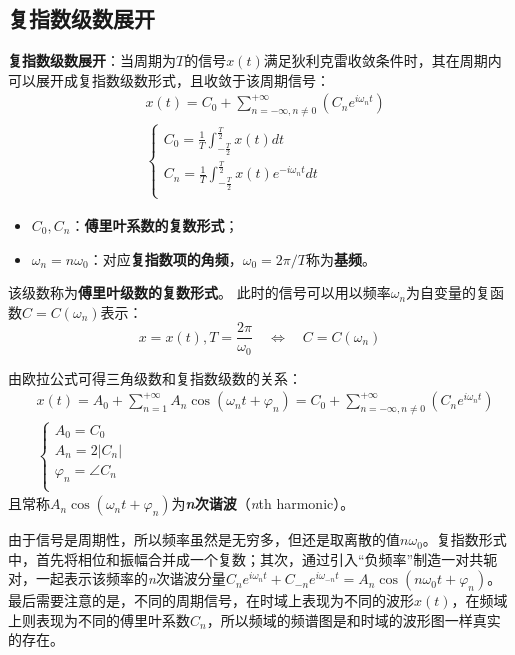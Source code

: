 \subsection{复指数级数展开}

{\bf 复指数级数展开}：当周期为$T$的信号$x\left( t \right) $满足狄利克雷收敛条件时，其在周期内可以展开成复指数级数形式，且收敛于该周期信号：
\begin{align*}
&x\left( t \right) =C_0+\sum_{n=-\infty ,n\ne 0}^{+\infty}{\left( C_ne^{i\omega _nt} \right)} \\
&\begin{cases}
	C_0=\frac{1}{T}\int_{-\frac{T}{2}}^{\frac{T}{2}}{x\left( t \right) dt}\\
	C_n=\frac{1}{T}\int_{-\frac{T}{2}}^{\frac{T}{2}}{x\left( t \right) e^{-i\omega _nt}dt}\\
\end{cases}
\end{align*}
\begin{itemize}
    \item $C_0,C_n$：{\bf 傅里叶系数的复数形式}；
    \item $\omega _n=n\omega _0$：对应{\bf 复指数项的角频}，$\omega _0=2\pi /T$称为{\bf 基频}。
\end{itemize}
该级数称为{\bf 傅里叶级数的复数形式}。
此时的信号可以用以频率$\omega _n$为自变量的复函数$C=C\left( \omega _n \right) $表示：
\[
x=x\left( t \right) ,T=\frac{2\pi}{\omega _0} \quad \Leftrightarrow \quad C=C\left( \omega _n \right)
\]

由欧拉公式可得三角级数和复指数级数的关系：
\begin{align*}
&x\left( t \right) =A_0+\sum_{n=1}^{+\infty}{A_n\cos \left( \omega _nt+\varphi _n \right)}=C_0+\sum_{n=-\infty ,n\ne 0}^{+\infty}{\left( C_ne^{i\omega _nt} \right)} \\
&\begin{cases}
	A_0=C_0\\
	A_n=2\left| C_n \right|\\
	\varphi _n=\angle C_n\\
\end{cases}
\end{align*}
且常称$A_n\cos \left( \omega _nt+\varphi _n \right) $为{\bf {\it n}次谐波}（{\it n}th harmonic）。

由于信号是周期性，所以频率虽然是无穷多，但还是取离散的值$n\omega _0$。复指数形式中，首先将相位和振幅合并成一个复数；其次，通过引入“负频率”制造一对共轭对，一起表示该频率的{\it n}次谐波分量$C_ne^{i\omega _nt}+C_{-n}e^{i\omega _{-n}t}=A_n\cos \left( n\omega _0t+\varphi _n \right) $。
最后需要注意的是，不同的周期信号，在时域上表现为不同的波形$x\left( t \right) $，在频域上则表现为不同的傅里叶系数$C_n$，所以频域的频谱图是和时域的波形图一样真实的存在。

